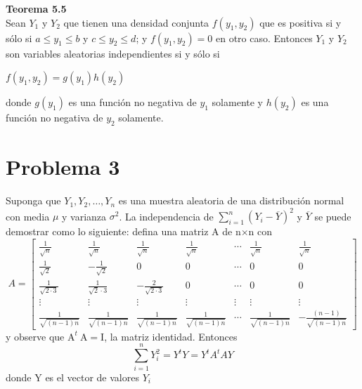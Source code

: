 \documentclass[a4paper,12pt]{article}
\begin{document}
\begin{enumerate}[a)]
    \textbf{Teorema 5.5}\\
    Sean $Y_1$ y $Y_2$ que tienen una densidad conjunta $f(y_1,y_2)$ que es positiva si y sólo si $a\leq y_1\leq b$ y $c\leq y_2 \leq d$; y $f(y_1,y_2) = 0$ en otro caso. Entonces $Y_1$ y $Y_2$ son variables aleatorias independientes si y sólo si
    \begin{center}
        $f(y_1,y_2) = g(y_1)h(y_2)$
    \end{center}
    donde $g(y_1)$ es una función no negativa de $y_1$ solamente y $h(y_2)$ es una función no negativa de $y_2$ solamente.
\end{enumerate}


\section{Problema 3}
Suponga que $Y_{1}, Y_{2}, \ldots, Y_{n}$ es una muestra aleatoria de una distribución normal con media $\mu$ y varianza $\sigma^{2}$. La independencia de $\sum_{i=1}^{n}\left(Y_{i}-\overline{Y}\right)^{2}$ y $\overline{Y}$ se puede demostrar como lo siguiente: defina una matriz A de n$\times$n con
$$
A=\left[\begin{array}{ccccccc}
\frac{1}{\sqrt{n}} & \frac{1}{\sqrt{n}} & \frac{1}{\sqrt{n}} & \frac{1}{\sqrt{n}} & \cdots & \frac{1}{\sqrt{n}} & \frac{1}{\sqrt{n}} \\
\frac{1}{\sqrt{2}} & -\frac{1}{\sqrt{2}} & 0 & 0 & \cdots & 0 & 0 \\
\frac{1}{\sqrt{2\cdot 3}} & \frac{1}{\sqrt{2}\cdot 3} & -\frac{2}{\sqrt{2\cdot 3}} & 0 & \cdots & 0 & 0 \\
\vdots & \vdots & \vdots & \vdots & \vdots & \vdots & \vdots \\
\frac{1}{\sqrt{(n-1) n}} & \frac{1}{\sqrt{(n-1) n}} & \frac{1}{\sqrt{(n-1) n}} & \frac{1}{\sqrt{(n-1) n}} & \cdots & \frac{1}{\sqrt{(n-1) n}} & -\frac{(n-1)}{\sqrt{(n-1) n}}
\end{array}\right]
$$
y observe que $\mathrm{A}^{t} \mathrm{~A}=\mathrm{I}$, la matriz identidad. Entonces
$$
\sum_{i=1}^{n} Y_{i}^{2}=Y^{t} Y=Y^{t} A^{t} A Y
$$
donde $\mathrm{Y}$ es el vector de valores $Y_{i}$
\end{document}
